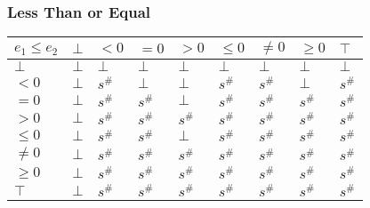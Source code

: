 \documentclass{beamer}
\begin{document}
                        \begin{frame}
                            \frametitle{Less Than or Equal}
                        \begin{table}[]
                            \begin{tabular}{|l|l|l|l|l|l|l|l|l|}
                            \hline
                            $e_1 \le e_2$ & $\bot$ & $<0$   & $=0$   & $>0$   & $\le 0$ & $\ne 0$ & $\ge 0$ & $\top$ \\ \hline
                            $\bot$        & $\bot$ & $\bot$ & $\bot$ & $\bot$ & $\bot$  & $\bot$  & $\bot$  & $\bot$ \\ \hline
                            $<0$          & $\bot$ & $s^\#$ & $\bot$ & $\bot$ & $s^\#$  & $s^\#$  & $\bot$  & $s^\#$ \\ \hline
                            $=0$          & $\bot$ & $s^\#$ & $s^\#$ & $\bot$ & $s^\#$  & $s^\#$  & $s^\#$  & $s^\#$ \\ \hline
                            $>0$          & $\bot$ & $s^\#$ & $s^\#$ & $s^\#$ & $s^\#$  & $s^\#$  & $s^\#$  & $s^\#$ \\ \hline
                            $\le 0$       & $\bot$ & $s^\#$ & $s^\#$ & $\bot$ & $s^\#$  & $s^\#$  & $s^\#$  & $s^\#$ \\ \hline
                            $\ne 0$       & $\bot$ & $s^\#$ & $s^\#$ & $s^\#$ & $s^\#$  & $s^\#$  & $s^\#$  & $s^\#$ \\ \hline
                            $\ge 0$       & $\bot$ & $s^\#$ & $s^\#$ & $s^\#$ & $s^\#$  & $s^\#$  & $s^\#$  & $s^\#$ \\ \hline
                            $\top$        & $\bot$ & $s^\#$ & $s^\#$ & $s^\#$ & $s^\#$  & $s^\#$  & $s^\#$  & $s^\#$ \\ \hline
                            \end{tabular}
                            \end{table}
                        \end{frame}
\end{document}
